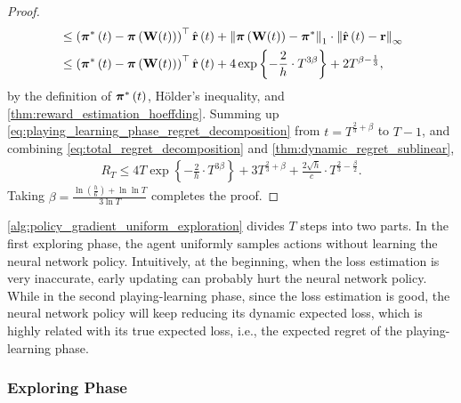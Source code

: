 \begin{proof}
\begin{equation}
\begin{split}
    &\le \left( {{\boldsymbol{\pi}}^*\left(t\right)} - {\boldsymbol{\pi}}\left( {\mathbf{W}}(t) \right) \right)^\top \hat{{\mathbf{r}}}\left(t\right)  + \left\| {\boldsymbol{\pi}}\left( {\mathbf{W}}(t) \right) - {\boldsymbol{\pi}}^* \right\|_1 \cdot \left\| \hat{{\mathbf{r}}}\left(t\right) - {\mathbf{r}} \right\|_\infty  \\
    &\le \left( {{\boldsymbol{\pi}}^*\left(t\right)} - {\boldsymbol{\pi}}\left( {\mathbf{W}}(t) \right) \right)^\top \hat{{\mathbf{r}}}\left(t\right)  + 4 \exp\left\{ - \frac{2}{h} \cdot  T^{3\beta} \right\} + 2 T^{\beta - \frac{1}{3}},
\end{split}
\end{equation}
by the definition of ${\boldsymbol{\pi}}^*\left(t\right)$, H{\"o}lder's inequality, and \cref{thm:reward_estimation_hoeffding}. Summing up \cref{eq:playing_learning_phase_regret_decomposition} from $t = T^{\frac{2}{3} + \beta}$ to $T - 1$, and
combining \cref{eq:total_regret_decomposition} and \cref{thm:dynamic_regret_sublinear},
\begin{equation*}
\begin{split}
    R_T \le  4 T \exp\left\{ - \frac{2}{h} \cdot  T^{3\beta} \right\} + 3 T^{\frac{2}{3} + \beta} + \frac{2 \sqrt{h}}{ c} \cdot T^{\frac{2}{3} - \frac{\beta}{2}}.
\end{split}
\end{equation*}
Taking $\beta = \frac{ \ln{\left(\frac{h}{6}\right) + \ln{\ln{T}} } }{ 3 \ln{T}} $ completes the proof.
\end{proof}

\cref{alg:policy_gradient_uniform_exploration} divides $T$ steps into two parts. In the first exploring phase, the agent uniformly samples actions without learning the neural network policy. Intuitively, at the beginning, when the loss estimation is very inaccurate, early updating can probably hurt the neural network policy.  While in the second playing-learning phase, since the loss estimation is good, the neural network policy will keep reducing its dynamic expected loss, which is highly related with its true expected loss, i.e., the expected regret of the playing-learning phase.

\subsubsection{Exploring Phase}
\label{subsubsec:exploring_phase}

